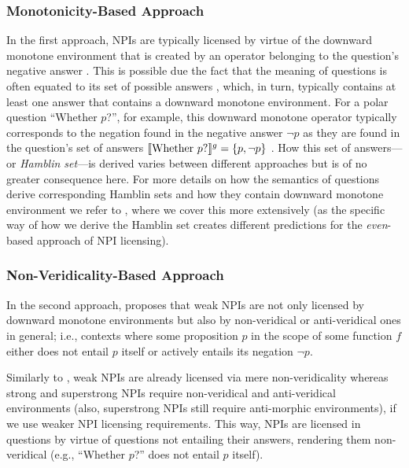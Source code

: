 \subsubsection{Monotonicity-Based Approach}
In the first approach, NPIs are typically licensed by virtue of the downward monotone environment that is created by an operator belonging to the question's negative answer \parencite{Guerzoni2004,Guerzoni2014,Nicolae2013,Nicolae2015}. This is possible due the fact that the meaning of questions is often equated to its set of possible answers \parencite{Hamblin1973}, which, in turn, typically contains at least one answer that contains a downward monotone environment. For a polar question \enquote{Whether $p$?}, for example, this downward monotone operator typically corresponds to the negation found in the negative answer $\neg p$ \parencite{Guerzoni2004,Guerzoni2014} as they are found in the question's set of answers $\llbracket\text{Whether $p$?}\rrbracket^{g}=\{p,\neg p\}$ \parencite{Hamblin1973}. How this set of answers---or \textit{Hamblin set}---is derived varies between different approaches but is of no greater consequence here. For more details on how the semantics of questions derive corresponding Hamblin sets and how they contain downward monotone environment we refer to , where we cover this more extensively (as the specific way of how we derive the Hamblin set creates different predictions for the \textit{even}-based approach of NPI licensing).

\subsubsection{Non-Veridicality-Based Approach}
In the second approach, \textcite{Giannakidou1998} proposes that weak NPIs are not only licensed by downward monotone environments but also by non-veridical or anti-veridical ones in general; i.e., contexts where some proposition $p$ in the scope of some function $f$ either does not entail $p$ itself or actively entails its negation $\neg p$.
\ex{}\label{def:nonveridicality}%

\xe
\ex{}\label{def:antiveridicality}%

\xe
Similarly to , weak NPIs are already licensed via mere non-veridicality whereas strong and superstrong NPIs require non-veridical and anti-veridical environments (also, superstrong NPIs still require anti-morphic environments), if we use  weaker NPI licensing requirements. This way, NPIs are licensed in questions by virtue of questions not entailing their answers, rendering them non-veridical (e.g., \enquote{Whether $p$?} does not entail $p$ itself).

